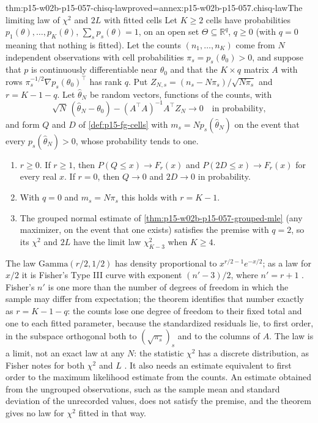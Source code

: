 \begin{hbtheorem}{thm:p15-w02b-p15-057-chisq-law}{proved=annex:p15-w02b-p15-057.chisq-law}{The limiting law of \(\chi^2\) and \(2L\) with fitted cells}
Let \(K\geq2\) cells have probabilities \(p_1(\theta),\ldots,p_K(\theta)\),
\(\sum_sp_s(\theta)=1\), on an open set \(\Theta\subseteq\mathbb R^q\),
\(q\geq0\) (with \(q=0\) meaning that nothing is fitted). Let the counts
\((n_1,\ldots,n_K)\) come from \(N\) independent observations with cell
probabilities \(\pi_s=p_s(\theta_0)>0\), and suppose that \(p\) is
continuously differentiable near \(\theta_0\) and that the \(K\times q\)
matrix \(A\) with rows \(\pi_s^{-1/2}\nabla p_s(\theta_0)^{\top}\) has rank
\(q\). Put \(Z_{N,s}=(n_s-N\pi_s)/\sqrt{N\pi_s}\) and \(r=K-1-q\). Let
\(\widehat\theta_N\) be random vectors, functions of the counts, with
\[
 \sqrt N\,(\widehat\theta_N-\theta_0)-(A^{\top}A)^{-1}A^{\top}Z_N\to0
 \quad\text{in probability},
\]
and form \(Q\) and \(D\) of \cref{def:p15-fg-cells} with
\(m_s=Np_s(\widehat\theta_N)\) on the event that every
\(p_s(\widehat\theta_N)>0\), whose probability tends to one.
\begin{enumerate}
\item \(r\geq0\). If \(r\geq1\), then \(P(Q\leq x)\to F_r(x)\) and
 \(P(2D\leq x)\to F_r(x)\) for every real \(x\). If \(r=0\), then \(Q\to0\)
 and \(2D\to0\) in probability.
\item With \(q=0\) and \(m_s=N\pi_s\) this holds with \(r=K-1\).
\item The grouped normal estimate of
 \cref{thm:p15-w02b-p15-057-grouped-mle} (any maximizer, on the event that
 one exists) satisfies the premise with \(q=2\), so its \(\chi^2\) and
 \(2L\) have the limit law \(\chi^2_{K-3}\) when \(K\geq4\).
\end{enumerate}
\end{hbtheorem}

The law \(\mathrm{Gamma}(r/2,1/2)\) has density proportional to
\(x^{r/2-1}e^{-x/2}\); as a law for \(x/2\) it is Fisher's Type III curve
with exponent \((n'-3)/2\), where \(n'=r+1\)
\cite[p.~358]{Fisher1922Foundations}. Fisher's \(n'\) is one more than the
number of degrees of freedom in which the sample may differ from
expectation; the theorem identifies that number exactly as
\(r=K-1-q\): the counts lose one degree of freedom to their fixed total and
one to each fitted parameter, because the standardized residuals lie, to
first order, in the subspace orthogonal both to \((\sqrt{\pi_s})_s\) and to
the columns of \(A\). The law is a limit, not an exact law at any \(N\): the
statistic \(\chi^2\) has a discrete distribution, as Fisher notes for both
\(\chi^2\) and \(L\) \cite[p.~358]{Fisher1922Foundations}. It also needs an
estimate equivalent to first order to the maximum likelihood estimate from
the counts. An estimate obtained from the ungrouped observations, such as
the sample mean and standard deviation of the unrecorded values, does not
satisfy the premise, and the theorem gives no law for \(\chi^2\) fitted in
that way.

